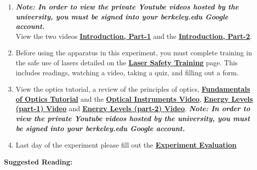 \documentclass{../lab}
\begin{document}
\begin{enumerate}

    \item \emph{\textbf{Note: In order to view the private Youtube videos hosted by the university, you must be signed into your berkeley.edu Google account.}}\\ 
    View the two videos \href{http://youtu.be/JZJlyaIT3B4}{\textbf{Introduction, Part-1}} and the \href{http://youtu.be/h81p2LXkgZY}{\textbf{Introduction, Part-2}}.

    \item Before using the apparatus in this experiment, you must complete training in the safe use of lasers detailed on the \href{http://experimentationlab.berkeley.edu/lasersafety}{\textbf{Laser Safety Training}} page. This includes readings, watching a video, taking a quiz, and filling out a form.

    \item View the optics tutorial, a review of the principles of optics, \href{http://experimentationlab.berkeley.edu/sites/default/files/ATM/fundamental-Optics.pdf}{\textbf{Fundamentals of Optics Tutorial}} and the \href{http://youtu.be/zUGBt5vc5FA}{\textbf{Optical Instruments Video}}, \href{http://youtu.be/wyBOVjU5bBQ}{\textbf{Energy Levels (part-1) Video}} and \href{http://youtu.be/Eypw0DmVBxk}{\textbf{Energy Levels (part-2) Video}}. \emph{\textbf{Note: In order to view the private Youtube videos hosted by the university, you must be signed into your berkeley.edu Google account.}}

    \item Last day of the experiment please fill out the \href{\ExperimentEvaluation}{\textbf{Experiment Evaluation}}

\end{enumerate}

\noindent\textbf{Suggested Reading:}
\end{document}
